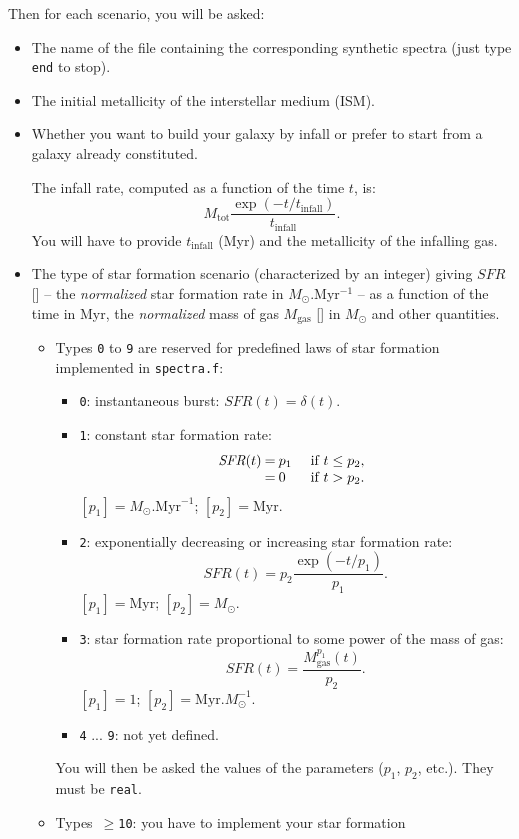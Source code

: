 \documentclass[11pt,draft,fleqn]{article}
\newcommand{\SFR}{\textit{SFR}}
\begin{document}
Then for each scenario, you will be asked: 
\begin{itemize}
\item The name of the file containing the corresponding synthetic spectra 
(just type \texttt{end} to stop).
\item The initial metallicity of the interstellar medium (ISM).
\item Whether you want to build your galaxy by infall or prefer to start from
a galaxy already constituted.

The infall rate, computed as a function of the time $t$, is: 
\[M_{\mathrm{tot}}\frac{\exp(-t/t_{\mathrm{infall}})}{t_{\mathrm{infall}}}.\]
You will have to provide $t_{\mathrm{infall}}$ (Myr) and the metallicity
of the infalling gas.
\item The type of star formation scenario (characterized by an integer)
giving $\SFR$ [\dag] -- the \emph{normalized} star formation rate 
in $M_{\odot}$.Myr$^{-1}$ --
as a function of the time in Myr, the \emph{normalized} 
mass of gas $M_{\mathrm{gas}}$ [\dag] in $M_{\odot}$ and other quantities.
\begin{itemize}
\item Types \texttt{0} to \texttt{9} are reserved for predefined laws of 
star formation implemented in \texttt{spectra.f}:
\begin{itemize}
\item \texttt{0}: instantaneous burst: $\SFR(t)=\delta(t).$ 
\item \texttt{1}: constant star formation rate:
\[\begin{array}{@{}l@{\:}c@{\:}ll}
\SFR(t)&=&p_1&\textrm{ if }t\le p_2,\\
&=&0&\textrm{ if }t>p_2.
\end{array}
\]
$[p_1]=M_{\odot}.\mathrm{Myr}^{-1}$; $[p_2]=\mathrm{Myr}$.
\item \texttt{2}: exponentially decreasing or increasing star formation rate:
\[\SFR(t)=p_2\frac{\exp(-t/p_1)}{p_1}.\]
$[p_1]=\mathrm{Myr}$; $[p_2]=M_{\odot}$.
\item \texttt{3}: star formation rate proportional to some power of the
mass of gas: 
\[\SFR(t)=\frac{M_{\mathrm{gas}}^{p_1}(t)}{p_2}.\]
$[p_1]=1$; $[p_2]=\mathrm{Myr}.M_{\odot}^{-1}$.
\item \texttt{4} ... \texttt{9}: not yet defined.
\end{itemize}
You will then be asked the values of the parameters ($p_1$, $p_2$,
etc.). They must be \texttt{real}.
\item Types~$\ge$\texttt{10}: you have to implement your star formation

\end{itemize}
\end{itemize}
\end{document}
